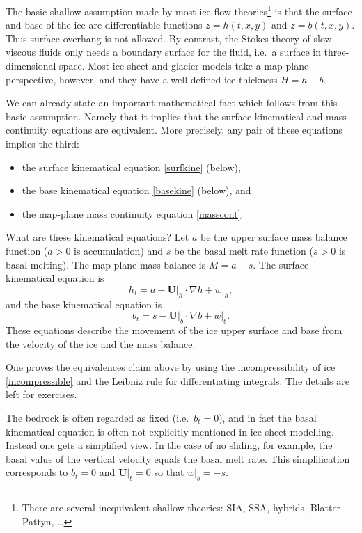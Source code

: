 \documentclass[letterpaper,final,12pt,reqno]{amsart}
\newcommand{\grad}{\nabla}
\begin{document}
The basic shallow assumption made by most ice flow theories\footnote{There are several inequivalent shallow theories: SIA, SSA, hybrids, Blatter-Pattyn, \dots} is that the surface and base of the ice are differentiable functions $z=h(t,x,y)$ and $z=b(t,x,y)$.  Thus surface overhang is not allowed.  By contrast, the Stokes theory of slow viscous fluids only needs a boundary surface for the fluid, i.e.~a surface in three-dimensional space.  Most ice sheet and glacier models take a map-plane perspective, however, and they have a well-defined ice thickness $H=h-b$.

We can already state an important mathematical fact which follows from this basic assumption.  Namely that it implies that the surface kinematical and mass continuity equations are equivalent.  More precisely, any pair of these equations implies the third:
  \begin{itemize}
  \item the surface kinematical equation \eqref{surfkine} (below),
  \item the base kinematical equation \eqref{basekine} (below), and
  \item the map-plane mass continuity equation \eqref{masscont}.
  \end{itemize}
What are these kinematical equations?  Let $a$ be the upper surface mass balance function ($a>0$ is accumulation) and $s$ be the basal melt rate function ($s>0$ is basal melting).  The map-plane mass balance is $M=a-s$.  The surface kinematical equation is 
\begin{equation}
h_t = a - \mathbf{U}\big|_h \cdot \grad h + w\big|_h,  \label{surfkine}
\end{equation}
and the base kinematical equation is
\begin{equation}
b_t = s - \mathbf{U}\big|_b \cdot \grad b + w\big|_b.  \label{basekine}
\end{equation}
These equations describe the movement of the ice upper surface and base from the velocity of the ice and the mass balance.

One proves the equivalences claim above by using the incompressibility of ice \eqref{incompressible} and the Leibniz rule for differentiating integrals.  The details are left for exercises.

The bedrock is often regarded as fixed (i.e.~$b_t=0$), and in fact the basal kinematical equation is often not explicitly mentioned in ice sheet modelling.  Instead one gets a simplified view.  In the case of no sliding, for example, the basal value of the vertical velocity equals the basal melt rate.  This simplification corresponds to $b_t=0$ and $\mathbf{U}\big|_b=0$ so that $w\big|_b=-s$.
\end{document}
